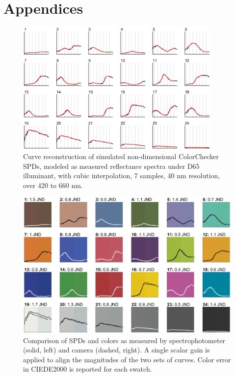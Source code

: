 \documentclass[twocolumn,10pt]{asme2ej}
\begin{document}
 

\clearpage 
\onecolumn
\section{Appendices}

\begin{figure}[H]
\begin{centering}
\includegraphics[width=0.90\textwidth]{colorchecker_reconstruction.eps}
\caption{Curve reconstruction of simulated non-dimensional ColorChecker SPDs, modeled as measured reflectance spectra under D65 illuminant, with cubic interpolation, 7 samples, 40 nm resolution, over 420 to 660 nm.}
\label{colorchecker_reconstruction}
\end{centering}
\end{figure}

\begin{figure}[H]
\centering
  \includegraphics[width=0.90\linewidth]{SPD_validation.eps}
  \caption{Comparison of SPDs and colors as measured by spectrophotometer (solid, left) and camera (dashed, right). A single scalar gain is applied to align the magnitudes of the two sets of curves. Color error in CIEDE2000 is reported for each swatch.}
  \label{SPD_validation}
\end{figure}
\end{document}
